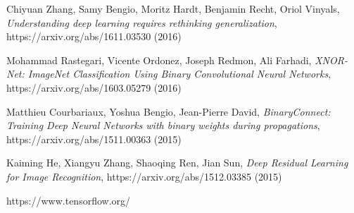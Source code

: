 \documentclass[licencjacka]{pracamgr}
\begin{document}
\begin{thebibliography}{99}

 Chiyuan Zhang, Samy Bengio, Moritz Hardt, Benjamin Recht, Oriol Vinyals, \textit{Understanding deep learning requires rethinking generalization}, https://arxiv.org/abs/1611.03530 (2016)

 Mohammad Rastegari, Vicente Ordonez, Joseph Redmon, Ali Farhadi, \textit{XNOR-Net: ImageNet Classification Using Binary Convolutional Neural Networks}, https://arxiv.org/abs/1603.05279 (2016)

 Matthieu Courbariaux, Yoshua Bengio, Jean-Pierre David, \textit{BinaryConnect: Training Deep Neural Networks with binary weights during propagations}, https://arxiv.org/abs/1511.00363 (2015)

 Kaiming He, Xiangyu Zhang, Shaoqing Ren, Jian Sun, \textit{Deep Residual Learning for Image Recognition}, https://arxiv.org/abs/1512.03385 (2015)

 https://www.tensorflow.org/

\end{thebibliography}
\end{document}
